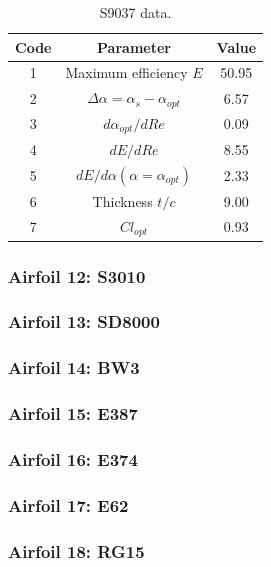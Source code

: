 \documentclass[../TFG_Annex.tex]{subfiles}
\begin{document}
\begin{table}[h!]
	\centering
	\begin{tabular}{c|c|c}
		Code & Parameter                                    & Value  \\ \hline
		1    & Maximum efficiency $E$                      &   50.95       \\
		2    & $\Delta \alpha=\alpha_{s}-\alpha_{opt}$    &         6.57          \\
		3    & ${d\alpha_{opt}}/{dRe}$                     &            0.09     \\
		4    & ${dE}/{dRe}$                                &        8.55     \\
		5    & ${dE}/{d \alpha} (\alpha=\alpha_{opt})$      &           2.33        \\
		6    & Thickness $t/c$                            &              9.00      \\
		7    & $Cl_{opt}$  &   0.93
	\end{tabular}
	\caption{S9037 data.}
	\label{tab:Airf11}
\end{table}




\newpage
\subsubsection{Airfoil 12: S3010}

\newpage
\subsubsection{Airfoil 13: SD8000}

\newpage
\subsubsection{Airfoil 14: BW3}

\newpage
\subsubsection{Airfoil 15: E387}

\newpage
\subsubsection{Airfoil 16: E374}

\newpage
\subsubsection{Airfoil 17: E62}

\newpage
\subsubsection{Airfoil 18: RG15}
\end{document}
